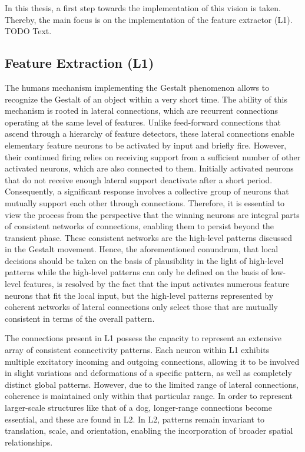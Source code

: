 In this thesis, a first step towards the implementation of this vision is taken. Thereby, the main focus is on the implementation of the feature extractor (L1).
TODO Text.

\subsection{Feature Extraction (L1)}
The humans mechanism implementing the Gestalt phenomenon allows to recognize the Gestalt of an object within a very short time. The ability of this mechanism is rooted in lateral connections, which are recurrent connections operating at the same level of features. Unlike feed-forward connections that ascend through a hierarchy of feature detectors, these lateral connections enable elementary feature neurons to be activated by input and briefly fire. However, their continued firing relies on receiving support from a sufficient number of other activated neurons, which are also connected to them. Initially activated neurons that do not receive enough lateral support deactivate after a short period. Consequently, a significant response involves a collective group of neurons that mutually support each other through connections. Therefore, it is essential to view the process from the perspective that the winning neurons are integral parts of consistent networks of connections, enabling them to persist beyond the transient phase. These consistent networks are the high-level patterns discussed in the Gestalt movement. Hence, the aforementioned  conundrum, that local decisions should be taken on the basis of plausibility in the light of high-level patterns while the high-level patterns can only be defined on the basis of low-level features, is resolved by the fact that the input activates numerous feature neurons that fit the local input, but the high-level patterns represented by coherent networks of lateral connections only select those that are mutually consistent in terms of the overall pattern.

The connections present in L1 possess the capacity to represent an extensive array of consistent connectivity patterns. Each neuron within L1 exhibits multiple excitatory incoming and outgoing connections, allowing it to be involved in slight variations and deformations of a specific pattern, as well as completely distinct global patterns. However, due to the limited range of lateral connections, coherence is maintained only within that particular range. In order to represent larger-scale structures like that of a dog, longer-range connections become essential, and these are found in L2. In L2, patterns remain invariant to translation, scale, and orientation, enabling the incorporation of broader spatial relationships.

